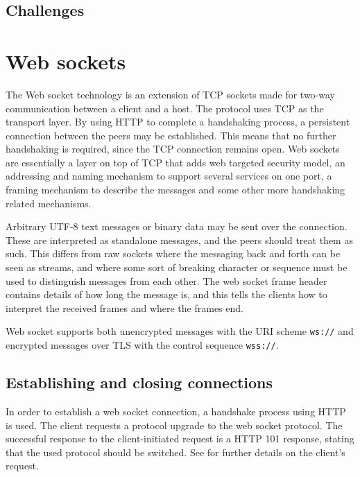 \subsection{Challenges}


\section{Web sockets}

The Web socket technology is an extension of TCP sockets made for two-way communication between a client and a host. The protocol uses TCP \cite{postel1981transmission} as the transport layer. By using HTTP to complete a handshaking process, a persistent connection between the peers may be established. This means that no further handshaking is required, since the TCP connection remains open. Web sockets are essentially a layer on top of TCP that adds web targeted security model, an addressing and naming mechanism to support several services on one port, a framing mechanism to describe the messages and some other more handshaking related mechanisms. \cite{fette2011websocket}

Arbitrary UTF-8 \cite{RFC3629} text messages or binary data may be sent over the connection. These are interpreted as standalone messages, and the peers should treat them as such. This differs from raw sockets where the messaging back and forth can be seen as streams, and where some sort of breaking character or sequence must be used to distinguish messages from each other. The web socket frame header contains details of how long the message is, and this tells the clients how to interpret the received frames and where the frames end.

Web socket supports both unencrypted messages with the URI scheme \texttt{ws://} and encrypted messages over TLS \cite{RFC5246} with the control sequence \texttt{wss://}.

\subsection{Establishing and closing connections}

In order to establish a web socket connection, a handshake process using HTTP is used. The client requests a protocol upgrade to the web socket protocol. The successful response to the client-initiated request is a HTTP 101 response, stating that the used protocol should be switched. \cite[section 10.1.2]{RFC2616} See \cite{RFC2616} for further details on the client's request.


